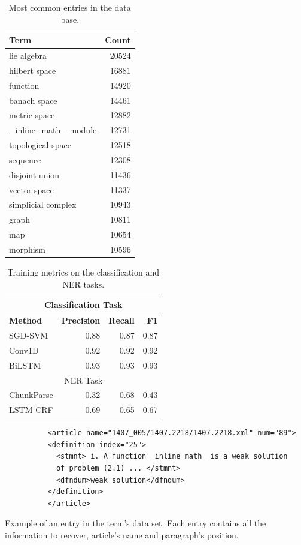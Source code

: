 \documentclass[11pt,a4paper]{article}
\begin{document}
\begin{table}
    \small
\centering
\begin{tabular}{lr}
    \hline \textbf{Term} &  \textbf{Count} \\ \hline
lie algebra & 20524 \\
hilbert space & 16881 \\
function & 14920 \\
banach space & 14461 \\
metric space & 12882 \\
\_inline\_math\_-module & 12731 \\
topological space & 12518 \\
sequence & 12308 \\
disjoint union & 11436 \\
vector space & 11337 \\
simplicial complex & 10943 \\
graph & 10811 \\
map & 10654 \\
morphism & 10596 \\
\hline

\end{tabular}
\caption{\label{term-cnt-tab} Most common entries in the data base. }
\end{table}


\begin{table}
    \small
\centering
\begin{tabular}{lrrr}
    \hline
    \multicolumn{4}{c}{Classification Task} \\
    \hline
\textbf{Method}  & \textbf{Precision} &  \textbf{Recall} & \textbf{F1}\\ 
\hline
    SGD-SVM & 0.88 & 0.87 & 0.87 \\
    Conv1D & 0.92 & 0.92 & 0.92 \\
    BiLSTM & 0.93 & 0.93 & 0.93 \\
     \hline
    \hline
    \multicolumn{4}{c}{NER Task} \\
    \hline
    ChunkParse & 0.32 & 0.68 & 0.43 \\
    LSTM-CRF & 0.69 & 0.65 & 0.67 \\
    \hline
\end{tabular}
\caption{\label{metric-comp} Training metrics on the classification
    and NER tasks.}
\end{table}

\begin{table}
    \centering
    \begin{verbatim}
          <article name="1407_005/1407.2218/1407.2218.xml" num="89">
          <definition index="25">
            <stmnt> i. A function _inline_math_ is a weak solution 
            of problem (2.1) ... </stmnt>
            <dfndum>weak solution</dfndum>
          </definition>
          </article>
\end{verbatim}
\caption{\label{glossary-example} Example of an entry in the term's data set. Each entry contains all the information to recover, article's name and paragraph's position.}
\end{table}
\end{document}
